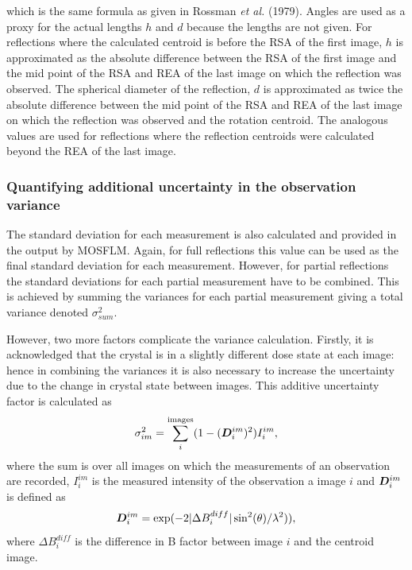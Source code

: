 which is the same formula as given in Rossman \textit{et al.} (1979). \nocite{rossmann1979processing}
Angles are used as a proxy for the actual lengths $h$ and $d$ because the lengths are not given.
For reflections where the calculated centroid is before the RSA of the first image, $h$ is approximated as the absolute difference between the RSA of the first image and the mid point of the RSA and REA of the last image on which the reflection was observed.
The spherical diameter of the reflection, $d$ is approximated as twice the absolute difference between the mid point of the RSA and REA of the last image on which the reflection was observed and the rotation centroid.
The analogous values are used for reflections where the reflection centroids were calculated beyond the REA of the last image.

\subsubsection{Quantifying additional uncertainty in the observation variance}
\label{subs:Quantifying additional uncertainty in the observation variance}
The standard deviation for each measurement is also calculated and provided in the output by MOSFLM.
Again, for full reflections this value can be used as the final standard deviation for each measurement.
However, for partial reflections the standard deviations for each partial measurement have to be combined.
This is achieved by summing the variances for each partial measurement giving a total variance denoted $\sigma^2_{sum}$.

However, two more factors complicate the variance calculation.
Firstly, it is acknowledged that the crystal is in a slightly different dose state at each image: hence in combining the variances it is also necessary to increase the uncertainty due to the change in crystal state between images.
This additive uncertainty factor is calculated as
\begin{equation}
    \sigma_{im}^2 = \sum_i^{\text{images}} (1 - (\boldsymbol{D}^{im}_i)^2) I^{im}_i,
\end{equation}
where the sum is over all images on which the measurements of an observation are recorded, $I^{im}_i$ is the measured intensity of the observation a image $i$ and $\boldsymbol{D}^{im}_i$ is defined as
\begin{equation}
    \boldsymbol{D}^{im}_i = \exp(-2 |\Delta B_{i}^{diff}|\sin^2(\theta) / \lambda^2)),
\end{equation}
where $\Delta B_{i}^{diff}$ is the difference in B factor between image $i$ and the centroid image.

